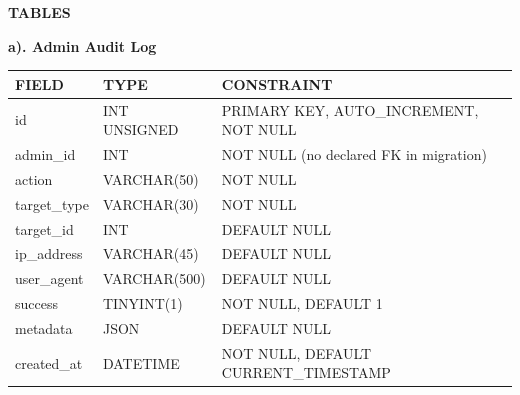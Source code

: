 \clearpage
\begin{center}
    \vspace*{\fill}
    \fontsize{28}{28}\selectfont \textbf{TABLES}
    \vspace*{\fill}
\end{center}
\clearpage

\noindent\textbf{a). Admin Audit Log}
\vspace{0.2cm}
\begin{center}
    \renewcommand{\arraystretch}{1.3}
    \begin{tabular}{|>{\raggedright\arraybackslash}p{3.0cm}|>{\raggedright\arraybackslash}p{4.5cm}|>{\raggedright\arraybackslash}p{8.5cm}|}
        \hline
        \rowcolor{lightgray!50}
        \textbf{FIELD} & \textbf{TYPE} & \textbf{CONSTRAINT}                    \\ \hline
        id             & INT UNSIGNED  & PRIMARY KEY, AUTO\_INCREMENT, NOT NULL \\ \hline
        admin\_id      & INT           & NOT NULL (no declared FK in migration) \\ \hline
        action         & VARCHAR(50)   & NOT NULL                               \\ \hline
        target\_type   & VARCHAR(30)   & NOT NULL                               \\ \hline
        target\_id     & INT           & DEFAULT NULL                           \\ \hline
        ip\_address    & VARCHAR(45)   & DEFAULT NULL                           \\ \hline
        user\_agent    & VARCHAR(500)  & DEFAULT NULL                           \\ \hline
        success        & TINYINT(1)    & NOT NULL, DEFAULT 1                    \\ \hline
        metadata       & JSON          & DEFAULT NULL                           \\ \hline
        created\_at    & DATETIME      & NOT NULL, DEFAULT CURRENT\_TIMESTAMP   \\ \hline
    \end{tabular}
\end{center}

